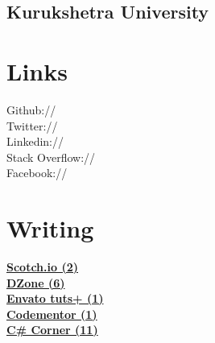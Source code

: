 \documentclass[]{gagan-resume}
\begin{document}
\begin{minipage}[t]{0.33\textwidth}
\subsection{Kurukshetra University}
\sectionsep




\section{Links} 
Github:// \href{https://github.com/sikrigagan}{} \\
Twitter://  \href{https://twitter.com/sikrigagan}{} \\
Linkedin://  \href{https://linkedin.com/in/sikrigagan}{} \\
Stack Overflow://  \href{https://stackoverflow.com/users/4129965/sikrigagan}{} \\
Facebook://  \href{https://facebook.com/sikrigagan}{}
\sectionsep



\section{Writing} 
\textbf{\href{https://scotch.io/@sikrigagan}{Scotch.io (2)}}\\
\textbf{\href{https://dzone.com/users/2733735/sikrigagan.html}{DZone (6)}}\\
\textbf{\href{https://tutsplus.com/authors/gagan-sikri}{Envato tuts+ (1)}}\\
\textbf{\href{https://www.codementor.io/sikrigagan}{Codementor (1)}}\\
\textbf{\href{http://www.c-sharpcorner.com/members/gagan-sikri}{C\# Corner (11)}}\\
\sectionsep



\end{minipage} 
\hfill
\end{document}

